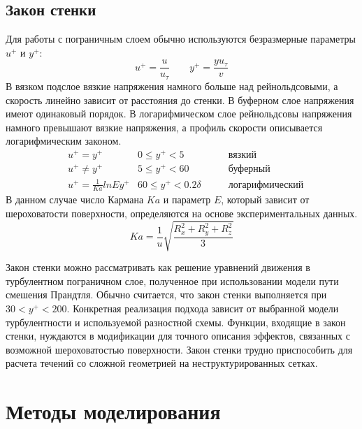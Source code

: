\subsection{Закон стенки}
	
	Для работы с пограничным слоем обычно используются безразмерные параметры $u^+$ и $y^+$:
	\begin{equation}
		u^+ = \frac{u}{u_\tau} \qquad y^+ = \frac{yu_\tau}{v}
	\end{equation}
	В вязком подслое вязкие напряжения намного больше над рейнольдсовыми, а скорость линейно зависит от расстояния до стенки. В буферном слое напряжения имеют одинаковый порядок. В логарифмическом слое рейнольдсовы напряжения намного превышают вязкие напряжения, а профиль скорости описывается логарифмическим законом.
	\begin{align}
		&u^+ = y^+ & 0 \leq y^+ < 5 & \qquad\text{вязкий} \nonumber\\
		&u^+ \neq y^+ & 5 \leq y^+ < 60 & \qquad\text{буферный} \nonumber\\
		&u^+ = \frac{1}{Ka}ln E y^+ & 60 \leq y^+ < 0.2\delta & \qquad\text{логарифмический}
	\end{align}
	В данном случае число Кармана $Ka$ и параметр $E$, который зависит от шероховатости поверхности, определяются на основе экспериментальных данных. 
	\begin{equation}
		Ka = \frac{1}{u}\sqrt{\frac{R_x^2 + R_y^2 + R_z^2}{3}}
	\end{equation}

	Закон стенки можно рассматривать как решение уравнений движения в турбулентном пограничном слое, полученное при использовании модели пути смешения Прандтля. Обычно считается, что закон стенки выполняется при $30 < y^+ < 200$. Конкретная реализация подхода зависит от выбранной модели турбулентности и используемой разностной схемы. Функции, входящие в закон стенки, нуждаются в модификации для точного описания эффектов, связанных с возможной шероховатостью поверхности. Закон стенки трудно приспособить для расчета течений со сложной геометрией на неструктурированных сетках.

\section{Методы моделирования}
	
